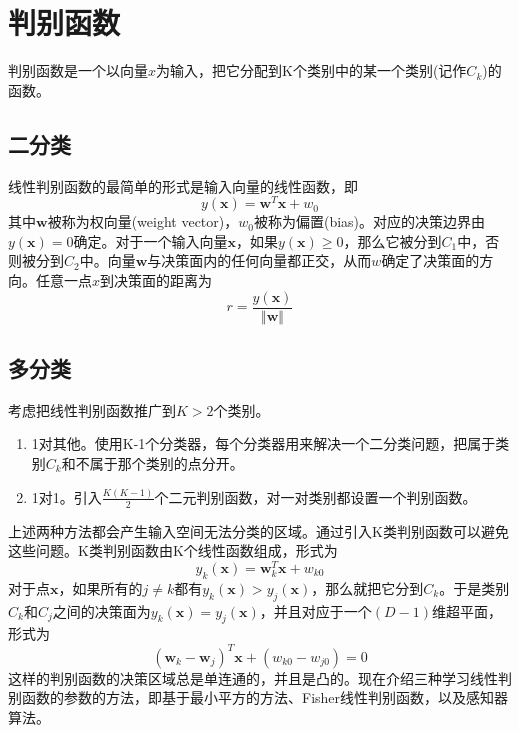 \section{判别函数}
判别函数是一个以向量$x$为输入，把它分配到K个类别中的某一个类别(记作$C_k$)的函数。
\subsection*{二分类}
线性判别函数的最简单的形式是输入向量的线性函数，即
\begin{equation}
	y(\boldsymbol{x})=\boldsymbol{w}^T\boldsymbol{x}+w_0
\end{equation}
其中$\boldsymbol{w}$被称为权向量(weight vector)，$w_0$被称为偏置(bias)。对应的决策边界由$y(\boldsymbol{x})=0$确定。对于一个输入向量$\boldsymbol{x}$，如果$y(\boldsymbol{x})\geqslant 0$，那么它被分到$C_1$中，否则被分到$C_2$中。向量$\boldsymbol{w}$与决策面内的任何向量都正交，从而$w$确定了决策面的方向。任意一点$x$到决策面的距离为
\begin{equation}
	r=\frac{y(\boldsymbol{x})}{\Vert \boldsymbol{w} \Vert}
\end{equation}
\subsection*{多分类}
考虑把线性判别函数推广到$K>2$个类别。
\begin{enumerate}
	\item 1对其他。使用K-1个分类器，每个分类器用来解决一个二分类问题，把属于类别$C_k$和不属于那个类别的点分开。
	\item 1对1。引入$\frac{K(K-1)}{2}$个二元判别函数，对一对类别都设置一个判别函数。
\end{enumerate}
上述两种方法都会产生输入空间无法分类的区域。通过引入K类判别函数可以避免这些问题。K类判别函数由K个线性函数组成，形式为
\begin{equation}
	y_k(\boldsymbol{x})=\boldsymbol{w}_k^T\boldsymbol{x}+w_{k0}
\end{equation}
对于点$\boldsymbol{x}$，如果所有的$j\ne k$都有$y_k(\boldsymbol{x})>y_j(\boldsymbol{x})$，那么就把它分到$C_k$。于是类别$C_k$和$C_j$之间的决策面为$y_k(\boldsymbol{x})=y_j(\boldsymbol{x})$，并且对应于一个$(D-1)$维超平面，形式为
\begin{equation}
	(\boldsymbol{w}_k-\boldsymbol{w}_j)^T\boldsymbol{x}+(w_{k0}-w_{j0})=0
\end{equation}
这样的判别函数的决策区域总是单连通的，并且是凸的。现在介绍三种学习线性判别函数的参数的方法，即基于最小平方的方法、Fisher线性判别函数，以及感知器算法。
